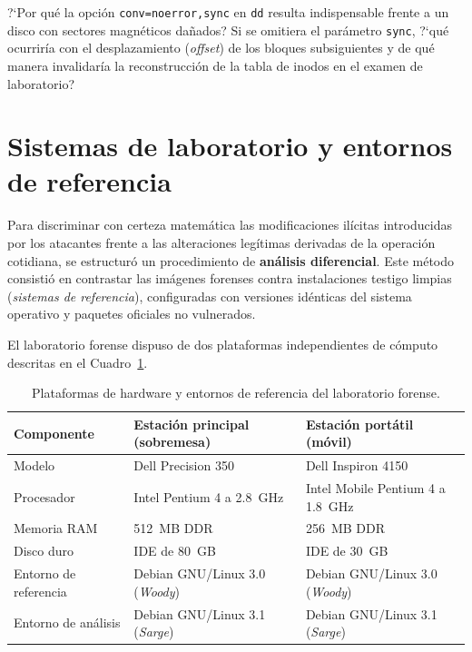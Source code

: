 \begin{retoforense}
?`Por qué la opción \texttt{conv=noerror,sync} en \texttt{dd} resulta indispensable frente a un disco con sectores magnéticos dañados? Si se omitiera el parámetro \texttt{sync}, ?`qué ocurriría con el desplazamiento (\textit{offset}) de los bloques subsiguientes y de qué manera invalidaría la reconstrucción de la tabla de inodos en el examen de laboratorio?
\end{retoforense}

\section{Sistemas de laboratorio y entornos de referencia}

Para discriminar con certeza matemática las modificaciones ilícitas introducidas por los atacantes frente a las alteraciones legítimas derivadas de la operación cotidiana, se estructuró un procedimiento de \textbf{análisis diferencial}. Este método consistió en contrastar las imágenes forenses contra instalaciones testigo limpias (\textit{sistemas de referencia}), configuradas con versiones idénticas del sistema operativo y paquetes oficiales no vulnerados.

El laboratorio forense dispuso de dos plataformas independientes de cómputo descritas en el Cuadro~\ref{tab:sistemas_laboratorio}.

\begin{table}[htbp]
\centering
\small
\begin{tabularx}{\textwidth}{@{} l X X @{}}
\toprule
\textbf{Componente} & \textbf{Estación principal (sobremesa)} & \textbf{Estación portátil (móvil)} \\
\midrule
Modelo & Dell Precision 350 & Dell Inspiron 4150 \\
Procesador & Intel Pentium 4 a 2.8~GHz & Intel Mobile Pentium 4 a 1.8~GHz \\
Memoria RAM & 512~MB DDR & 256~MB DDR \\
Disco duro & IDE de 80~GB & IDE de 30~GB \\
Entorno de referencia & Debian GNU/Linux 3.0 (\textit{Woody}) & Debian GNU/Linux 3.0 (\textit{Woody}) \\
Entorno de análisis & Debian GNU/Linux 3.1 (\textit{Sarge}) & Debian GNU/Linux 3.1 (\textit{Sarge}) \\
\bottomrule
\end{tabularx}
\caption{Plataformas de hardware y entornos de referencia del laboratorio forense.}
\label{tab:sistemas_laboratorio}
\end{table}

